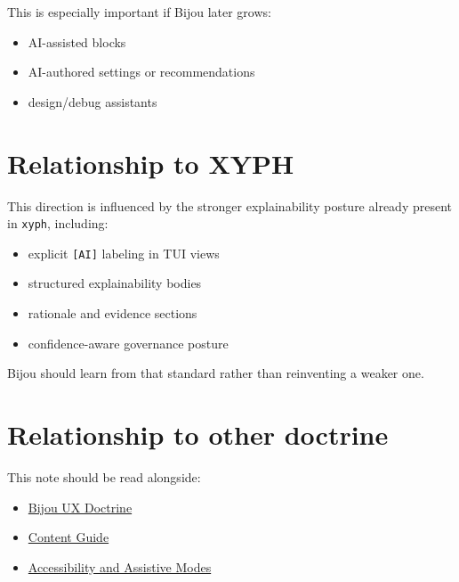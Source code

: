 This is especially important if Bijou later grows:

\begin{itemize}
\tightlist
\item
  AI-assisted blocks
\item
  AI-authored settings or recommendations
\item
  design/debug assistants
\end{itemize}

\section{Relationship to XYPH}\label{record-033-relationship-to-xyph}

This direction is influenced by the stronger explainability posture already present in \texttt{x\allowbreak{}y\allowbreak{}p\allowbreak{}h}, including:

\begin{itemize}
\tightlist
\item
  explicit \texttt{[\allowbreak{}A\allowbreak{}I\allowbreak{}]} labeling in TUI views
\item
  structured explainability bodies
\item
  rationale and evidence sections
\item
  confidence-aware governance posture
\end{itemize}

Bijou should learn from that standard rather than reinventing a weaker one.

\section{Relationship to other doctrine}\label{record-033-relationship-to-other-doctrine}

This note should be read alongside:

\begin{itemize}
\tightlist
\item
  \href{https://github.com/flyingrobots/bijou/blob/cbd70612140e7a450d764b3c7be1c6af878b99bc/docs/strategy/bijou-ux-doctrine.md}{Bijou UX Doctrine}
\item
  \href{https://github.com/flyingrobots/bijou/blob/cbd70612140e7a450d764b3c7be1c6af878b99bc/docs/strategy/content-guide.md}{Content Guide}
\item
  \href{https://github.com/flyingrobots/bijou/blob/cbd70612140e7a450d764b3c7be1c6af878b99bc/docs/strategy/accessibility-and-assistive-modes.md}{Accessibility and Assistive Modes}
\end{itemize}

